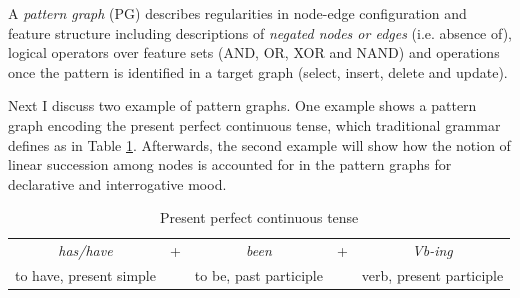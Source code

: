 
\begin{definition}\label{def:graph-pattern}
    A \textit{pattern graph} (PG) describes regularities in node-edge configuration and feature structure including descriptions of \textit{negated nodes or edges} (i.e. absence of), logical operators over feature sets (AND, OR, XOR and NAND) and operations once the pattern is identified in a target graph (select, insert, delete and update).
\end{definition}




Next I discuss two example of pattern graphs. One example shows a pattern graph encoding the present perfect continuous tense, which traditional grammar defines as in Table \ref{tab:ppc-pattern}. Afterwards, the second example will show how the notion of linear succession among nodes is accounted for in the pattern graphs for declarative and interrogative mood.

\begin{table}[!ht]
	\centering
	\begin{tabular}{|clclc|}
		\hline
		\textit{has/have}       & + & \textit{been}          & + & \textit{Vb-ing}          \\
		to have, present simple &   & to be, past participle &   & verb, present participle \\ \hline
	\end{tabular}
	\caption{Present perfect continuous tense}
	\label{tab:ppc-pattern}
\end{table}

